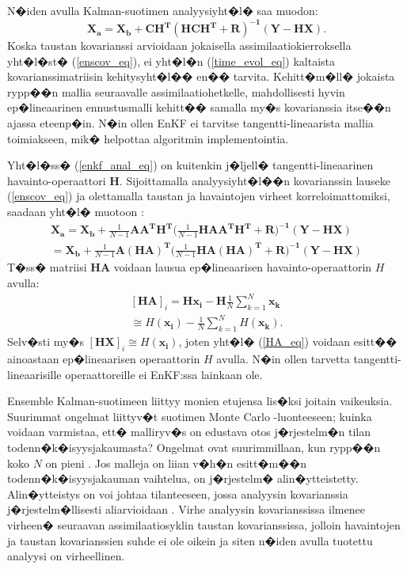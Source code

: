 \documentclass[12pt,a4paper,finnish,margin=2in]{article}
\begin{document}
N�iden avulla Kalman-suotimen analyysiyht�l� saa muodon:
\begin{equation} \label{enkf_anal_eq}
\mathbf{X_a = X_b + CH^T (HCH^T+R)^{-1} (Y-HX)}.
\end{equation}
Koska taustan kovarianssi arvioidaan jokaisella assimilaatiokierroksella yht�l�st� (\ref{enscov_eq}), ei yht�l�n (\ref{time_evol_eq}) kaltaista kovarianssimatriisin kehitysyht�l�� en�� tarvita. Kehitt�m�ll� jokaista rypp��n mallia seuraavalle assimilaatiohetkelle, mahdollisesti hyvin ep�lineaarinen ennustusmalli kehitt�� samalla my�s kovarianssia itse��n ajassa eteenp�in. N�in ollen EnKF ei tarvitse tangentti-lineaarista mallia toimiakseen, mik� helpottaa algoritmin implementointia. 

Yht�l�ss� (\ref{enkf_anal_eq}) on kuitenkin j�ljell� tangentti-lineaarinen havainto-operaattori $\mathbf{H}$. Sijoittamalla analyysiyht�l��n kovarianssin lauseke (\ref{enscov_eq}) ja olettamalla taustan ja havaintojen virheet korreloimattomiksi, saadaan yht�l� muotoon \citep{mandel_2006}:
\begin{align} \label{ha_analysis_eq}
\mathbf{X_a = X_b} + \frac{1}{N-1} \mathbf{A A^T H^T} (\frac{1}{N-1} \mathbf{H A A^T H^T+R)^{-1} (Y-HX)}\nonumber \\
= \mathbf{X_b} + \frac{1}{N-1} \mathbf{A (HA)^T} (\frac{1}{N-1} \mathbf{HA(HA)^T  + R)^{-1} (Y-HX)}
\end{align}
T�ss� matriisi $\mathbf{HA}$ voidaan lausua ep�lineaarisen havainto-operaattorin $H$ avulla:
\begin{align} \label{HA_eq}
[\mathbf{HA}]_i = \mathbf{H x_i} - \mathbf{H} \frac{1}{N} \sum_{k=1}^{N} \mathbf{x_k} \nonumber\\
\cong H(\mathbf{x_i}) - \frac{1}{N} \sum_{k=1}^{N} H(\mathbf{x_k}).
\end{align}
Selv�sti my�s $\mathbf{[HX]}_i \cong H(\mathbf{x_i})$, joten yht�l� (\ref{HA_eq}) voidaan esitt�� ainoastaan ep�lineaarisen operaattorin $H$ avulla. N�in ollen tarvetta tangentti-lineaarisille operaattoreille ei EnKF:ssa lainkaan ole. 

Ensemble Kalman-suotimeen liittyy monien etujensa lis�ksi joitain vaikeuksia. Suurimmat ongelmat liittyv�t suotimen Monte Carlo -luonteeseen; kuinka voidaan varmistaa, ett� malliryv�s on edustava otos j�rjestelm�n tilan todenn�k�isyysjakaumasta? Ongelmat ovat suurimmillaan, kun rypp��n koko $N$ on pieni \citep{houtekamer_1998}. Jos malleja on liian v�h�n esitt�m��n todenn�k�isyysjakauman vaihtelua, on j�rjestelm� alin�ytteistetty. Alin�ytteistys on voi johtaa tilanteeseen, jossa analyysin kovarianssia j�rjestelm�llisesti aliarvioidaan \citep{lorenc_2003}. Virhe analyysin kovarianssissa ilmenee virheen� seuraavan assimilaatiosyklin taustan kovarianssissa, jolloin havaintojen ja taustan kovarianssien suhde ei ole oikein ja siten n�iden avulla tuotettu analyysi on virheellinen. 
\end{document}
